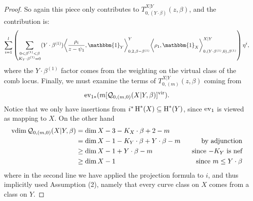 \begin{proof}
So again this piece only contributes to $T_{0,(Y\cdot\beta)}^{X|Y}(z,\beta)$, and the contribution is:
\begin{equation*} \sum_{i=1}^l \left( \sum_{\substack{0 < \beta^{(1)} < \beta \\ K_Y \cdot \beta^{(1)}=0}} (Y \cdot \beta^{(1)}) \bigg\langle \dfrac{\rho_i}{z-\psi_1}, \mathbbm{1}_Y \bigg\rangle_{0,2,\beta-\beta^{(1)}}^Y \bigg\langle \rho_1, \mathbbm{1}_X \bigg\rangle_{0,(Y \cdot \beta^{(1)},0),\beta^{(1)}}^{X|Y} \right) \eta^i, \end{equation*}
where the $Y \cdot \beta^{(1)}$ factor comes from the weighting on the virtual class of the comb locus. Finally, we must examine the terms of $T_{0,(m)}^{X|Y}(z,\beta)$ coming from
\begin{equation*}\operatorname{ev}_{1*}(m[\mathcal{Q}_{0,(m,0)}(X|Y,\beta)]^{\mathrm{vir}}). \end{equation*} 
Notice that we only have insertions from $i^*\operatorname{H}^*(X) \subseteq \operatorname{H}^*(Y)$, since $\operatorname{ev}_1$ is viewed as mapping to $X$. On the other hand
\begin{align*} \operatorname{vdim} \mathcal{Q}_{0,(m,0)}(X|Y,\beta) & = \dim X-3 -K_X \cdot \beta +2-m & \\
& = \dim X - 1 -K_Y \cdot \beta + Y \cdot \beta - m \ \ & \text{by adjunction} \\
& \geq \dim X - 1 + Y\cdot\beta - m \ \ & \text{since $-K_Y$ is nef} \\
& \geq \dim X - 1 \ \ & \text{since $m \leq Y \cdot \beta$} \end{align*}
where in the second line we have applied the projection formula to $i$, and thus implicitly used Assumption (2), namely that every curve class on $X$ comes from a class on $Y$.


\end{proof}
